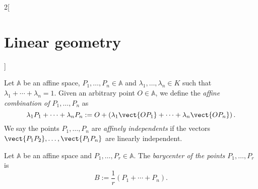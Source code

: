 \documentclass[../../../main.tex]{subfiles}
\begin{document}
\begin{multicols}{2}[\section{Linear geometry}]
\begin{definition}
        Let $\mathbb{A}$ be an affine space, $P_1,\ldots,P_n\in\mathbb{A}$ and $\lambda_1,\ldots,\lambda_n\in K$ such that $\lambda_1+\cdots+\lambda_n=1$. Given an arbitrary point $O\in\mathbb{A}$, we define the \textit{affine combination of $P_1,\ldots,P_n$} as $$\lambda_1P_1+\cdots+\lambda_nP_n:=O+\left(\lambda_1\vect{OP_1}+\cdots+\lambda_n\vect{OP_n}\right).$$ We say the points $P_1,\ldots,P_n$ are \textit{affinely independents} if the vectors $\vect{P_1P_2},\ldots,\vect{P_1P_n}$ are linearly independent.
    \end{definition}
    \begin{definition}
        Let $\mathbb{A}$ be an affine space and $P_1,\ldots,P_r\in\mathbb{A}$. The \textit{barycenter of the points $P_1,\ldots,P_r$} is $$B:=\frac{1}{r}\left(P_1+\cdots+P_n\right).$$
    \end{definition}

\end{multicols}
\end{document}
